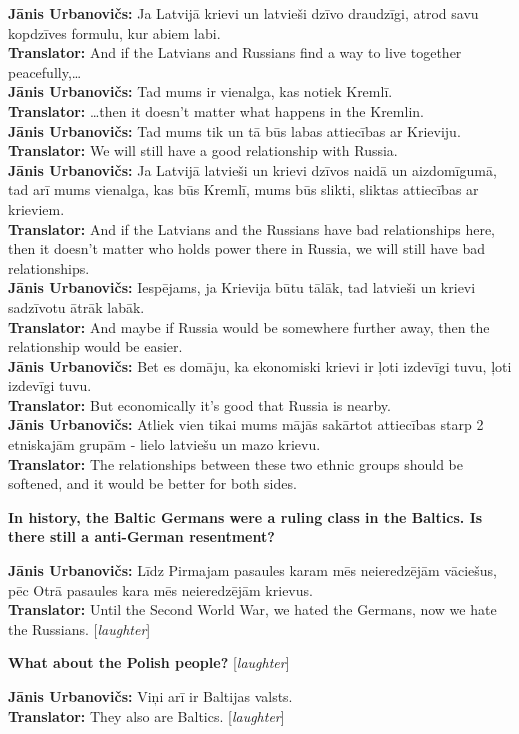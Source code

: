 \textbf{Jānis Urbanovičs:} Ja Latvijā krievi un latvieši dzīvo draudzīgi, atrod savu kopdzīves formulu, kur abiem labi.\\  
\textbf{Translator:} And if the Latvians and Russians find a way to live together peacefully,…\\ 
\textbf{Jānis Urbanovičs:} Tad mums ir vienalga, kas notiek Kremlī.\\ 
\textbf{Translator:} …then it doesn't matter what happens in the Kremlin.\\  
\textbf{Jānis Urbanovičs:} Tad mums tik un tā būs labas attiecības ar Krieviju.\\
\textbf{Translator:} We will still have a good relationship with Russia. \\ 
\textbf{Jānis Urbanovičs:} Ja Latvijā latvieši un krievi dzīvos naidā un aizdomīgumā, tad arī mums vienalga, kas būs Kremlī, mums būs slikti, sliktas attiecības ar krieviem.\\ 
\textbf{Translator:} And if the Latvians and the Russians have bad relationships here, then it doesn't matter who holds power there in Russia, we will still have bad relationships.\\  
\textbf{Jānis Urbanovičs:} Iespējams, ja Krievija būtu tālāk, tad latvieši un krievi sadzīvotu ātrāk labāk.\\ 
\textbf{Translator:} And maybe if Russia would be somewhere further away, then the relationship would be easier.\\
\textbf{Jānis Urbanovičs:} Bet es domāju, ka ekonomiski krievi ir ļoti izdevīgi tuvu, ļoti izdevīgi tuvu.\\
\textbf{Translator:} But economically it's good that Russia is nearby.\\ 
\textbf{Jānis Urbanovičs:} Atliek vien tikai mums mājās sakārtot attiecības starp 2 etniskajām grupām - lielo latviešu un mazo krievu.\\  
\textbf{Translator:} The relationships between these two ethnic groups should be softened, and it would be better for both sides. 

\textbf{In history, the Baltic Germans were a ruling class in the Baltics. Is there still a anti-German resentment?} 

\textbf{Jānis Urbanovičs:} Līdz Pirmajam pasaules karam mēs neieredzējām vāciešus, pēc Otrā pasaules kara mēs neieredzējām krievus.\\ 
\textbf{Translator:} Until the Second World War, we hated the Germans, now we hate the Russians. [\textit{laughter}]  

\textbf{What about the Polish people?} [\textit{laughter}]  

\textbf{Jānis Urbanovičs:} Viņi arī ir Baltijas valsts. \\
\textbf{Translator:} They also are Baltics. [\textit{laughter}] 